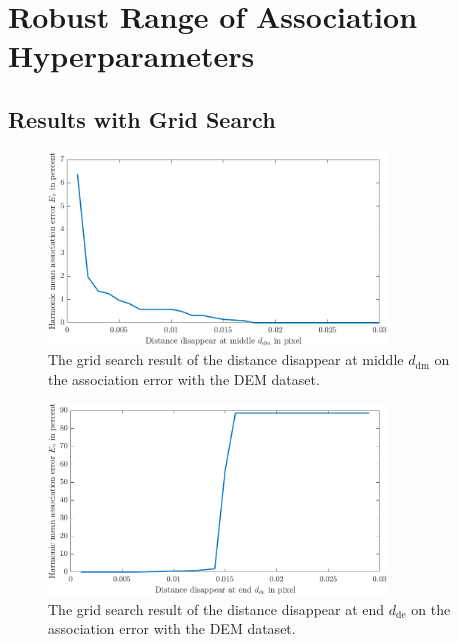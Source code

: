 \FloatBarrier

\section{Robust Range of Association Hyperparameters}
\label{Robust Range of Association Hyperparameters}

\subsection{Results with Grid Search}

\begin{figure}[htb]
\centering
\includegraphics[width=0.8\textwidth]{figures/Asso/gridsearch1.png}
\caption{The grid search result of the distance disappear at middle $d_{\mathrm{dm}}$ on the association error with the DEM dataset.}
\label{asso gs1}
\end{figure}

\begin{figure}[htb]
\centering
\includegraphics[width=0.8\textwidth]{figures/Asso/gridsearch2.png}
\caption{The grid search result of the distance disappear at end $d_{\mathrm{de}}$ on the association error with the DEM dataset.}
\label{asso gs2}
\end{figure}


